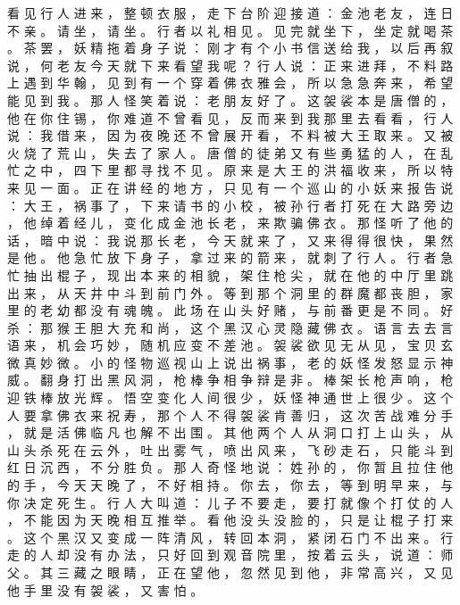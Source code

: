 {看 见 行 人 进 来 ， 整 顿 衣 服 ， 走 下 台 阶 迎 接 道 ： 金 池 老 友 ， 连 日 不 亲 。
请 坐 ， 请 坐 。
行 者 以 礼 相 见 。
见 完 就 坐 下 ， 坐 定 就 喝 茶 。
茶 罢 ， 妖 精 拖 着 身 子 说 ： 刚 才 有 个 小 书 信 送 给 我 ， 以 后 再 叙 说 ， 何 老 友 今 天 就 下 来 看 望 我 呢 ？ 行 人 说 ： 正 来 进 拜 ， 不 料 路 上 遇 到 华 翰 ， 见 到 有 一 个 穿 着 佛 衣 雅 会 ， 所 以 急 急 奔 来 ， 希 望 能 见 到 我 。
那 人 怪 笑 着 说 ： 老 朋 友 好 了 。
这 袈 裟 本 是 唐 僧 的 ， 他 在 你 住 锡 ， 你 难 道 不 曾 看 见 ， 反 而 来 到 我 那 里 去 看 看 ， 行 人 说 ： 我 借 来 ， 因 为 夜 晚 还 不 曾 展 开 看 ， 不 料 被 大 王 取 来 。
又 被 火 烧 了 荒 山 ， 失 去 了 家 人 。
唐 僧 的 徒 弟 又 有 些 勇 猛 的 人 ， 在 乱 忙 之 中 ， 四 下 里 都 寻 找 不 见 。
原 来 是 大 王 的 洪 福 收 来 ， 所 以 特 来 见 一 面 。
正 在 讲 经 的 地 方 ， 只 见 有 一 个 巡 山 的 小 妖 来 报 告 说 ： 大 王 ， 祸 事 了 ， 下 来 请 书 的 小 校 ， 被 孙 行 者 打 死 在 大 路 旁 边 ， 他 绰 着 经 儿 ， 变 化 成 金 池 长 老 ， 来 欺 骗 佛 衣 。
那 怪 听 了 他 的 话 ， 暗 中 说 ： 我 说 那 长 老 ， 今 天 就 来 了 ， 又 来 得 得 很 快 ， 果 然 是 他 。
他 急 忙 放 下 身 子 ， 拿 过 来 的 箭 来 ， 就 刺 了 行 人 。
行 者 急 忙 抽 出 棍 子 ， 现 出 本 来 的 相 貌 ， 架 住 枪 尖 ， 就 在 他 的 中 厅 里 跳 出 来 ， 从 天 井 中 斗 到 前 门 外 。
等 到 那 个 洞 里 的 群 魔 都 丧 胆 ， 家 里 的 老 幼 都 没 有 魂 魄 。
此 场 在 山 头 好 赌 ， 与 前 番 更 是 不 同 。
好 杀 ： 那 猴 王 胆 大 充 和 尚 ， 这 个 黑 汉 心 灵 隐 藏 佛 衣 。
语 言 去 去 言 语 来 ， 机 会 巧 妙 ， 随 机 应 变 不 差 池 。
袈 裟 欲 见 无 从 见 ， 宝 贝 玄 微 真 妙 微 。
小 的 怪 物 巡 视 山 上 说 出 祸 事 ， 老 的 妖 怪 发 怒 显 示 神 威 。
翻 身 打 出 黑 风 洞 ， 枪 棒 争 相 争 辩 是 非 。
棒 架 长 枪 声 响 ， 枪 迎 铁 棒 放 光 辉 。
悟 空 变 化 人 间 很 少 ， 妖 怪 神 通 世 上 很 少 。
这 个 人 要 拿 佛 衣 来 祝 寿 ， 那 个 人 不 得 袈 裟 肯 善 归 ， 这 次 苦 战 难 分 手 ， 就 是 活 佛 临 凡 也 解 不 出 围 。
其 他 两 个 人 从 洞 口 打 上 山 头 ， 从 山 头 杀 死 在 云 外 ， 吐 出 雾 气 ， 喷 出 风 来 ， 飞 砂 走 石 ， 只 能 斗 到 红 日 沉 西 ， 不 分 胜 负 。
那 人 奇 怪 地 说 ： 姓 孙 的 ， 你 暂 且 拉 住 他 的 手 ， 今 天 天 晚 了 ， 不 好 相 持 。
你 去 ， 你 去 ， 等 到 明 早 来 ， 与 你 决 定 死 生 。
行 人 大 叫 道 ： 儿 子 不 要 走 ， 要 打 就 像 个 打 仗 的 人 ， 不 能 因 为 天 晚 相 互 推 举 。
看 他 没 头 没 脸 的 ， 只 是 让 棍 子 打 来 。
这 个 黑 汉 又 变 成 一 阵 清 风 ， 转 回 本 洞 ， 紧 闭 石 门 不 出 来 。
行 走 的 人 却 没 有 办 法 ， 只 好 回 到 观 音 院 里 ， 按 着 云 头 ， 说 道 ： 师 父 。
其 三 藏 之 眼 睛 ， 正 在 望 他 ， 忽 然 见 到 他 ， 非 常 高 兴 ， 又 见 他 手 里 没 有 袈 裟 ， 又 害 怕 。
}
